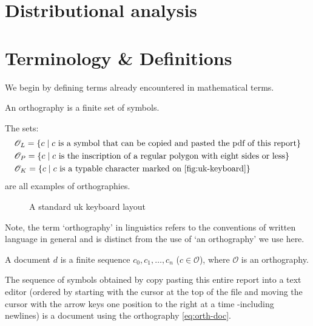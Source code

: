 \section{Distributional analysis}
\section{Terminology \& Definitions}
We begin by defining terms already encountered in mathematical terms.

\begin{definition}[Orthography]\label{def:orthography}
  An orthography is a finite set of symbols.
\end{definition}

\begin{example}\label{ex:orthographies}
  The sets:
  \begin{align}
    &\mathscr{O}_L=\{c\mid\text{$c$ is a symbol that can be copied and pasted the pdf of this report}\}\label{eq:orth-doc}\\
    &\mathscr{O}_P=\{c\mid\text{$c$ is the inscription of a regular polygon with eight sides or less}\}\label{eq:orth-shape}\\
    &\mathscr{O}_K=\{c\mid\text{$c$ is a typable character marked on \autoref{fig:uk-keyboard}}\}\label{eq:orth-keyboard}
  \end{align}
  are all examples of orthographies.
\end{example}
\vspace{6pt}

\begin{figure}[ht]
 \centering
 
 \caption{A standard uk keyboard layout}
 \label{fig:uk-keyboard}
\end{figure}

Note, the term `orthography' in linguistics refers to the conventions of written language in general and is distinct from the use of `an orthography' we use here.

\begin{definition}[Document]
  A document $d$ is a finite sequence $c_0,c_1,\dots,c_n$ ($c\in\mathscr{O}$), where $\mathscr{O}$ is an orthography.
\end{definition}

\begin{example}\label{ex:doc-report}
    The sequence of symbols obtained by copy pasting this entire report into a text editor (ordered by starting with the cursor at the top of the file and moving the cursor with the arrow keys one position to the right at a time -including newlines) is a document using the orthography \ref{eq:orth-doc}.
\end{example}
\vspace{6pt}

